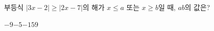부등식 $|3x-2|\ge |2x-7|$의 해가 $x\le a$ 또는 $x\ge b$일 때, $ab$의 값은?
\begin{choices32}{$-9$}{$-5$}{$-1$}{$5$}{$9$}\end{choices32}
